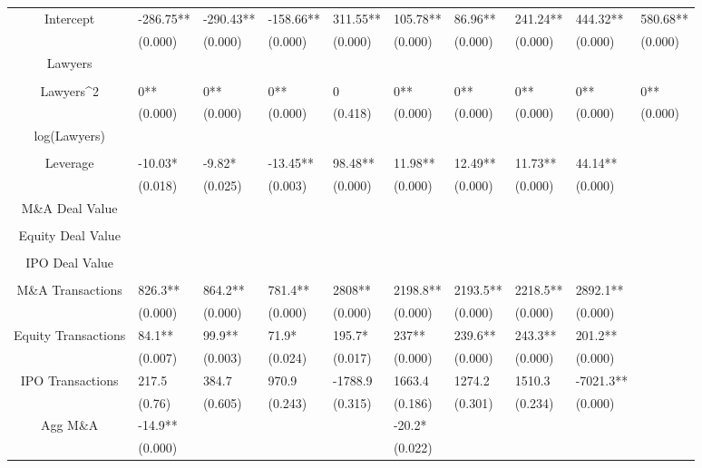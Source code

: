 \documentclass{article}
\begin{document}
\begin{table}[H]
\begin{tabular}{|clllllllll|}
Intercept & -286.75** & -290.43** & -158.66** & 311.55** & 105.78** & 86.96** & 241.24** & 444.32** & 580.68** \\ 
   & (0.000) & (0.000) & (0.000) & (0.000) & (0.000) & (0.000) & (0.000) & (0.000) & (0.000) \\ 
  Lawyers &  &  &  &  &  &  &  &  &  \\ 
   &  &  &  &  &  &  &  &  &  \\ 
  Lawyers^2 & 0** & 0** & 0** & 0 & 0** & 0** & 0** & 0** & 0** \\ 
   & (0.000) & (0.000) & (0.000) & (0.418) & (0.000) & (0.000) & (0.000) & (0.000) & (0.000) \\ 
  log(Lawyers) &  &  &  &  &  &  &  &  &  \\ 
   &  &  &  &  &  &  &  &  &  \\ 
  Leverage & -10.03* & -9.82* & -13.45** & 98.48** & 11.98** & 12.49** & 11.73** & 44.14** &  \\ 
   & (0.018) & (0.025) & (0.003) & (0.000) & (0.000) & (0.000) & (0.000) & (0.000) &  \\ 
  M\&A Deal Value &  &  &  &  &  &  &  &  &  \\ 
   &  &  &  &  &  &  &  &  &  \\ 
  Equity Deal Value &  &  &  &  &  &  &  &  &  \\ 
   &  &  &  &  &  &  &  &  &  \\ 
  IPO Deal Value &  &  &  &  &  &  &  &  &  \\ 
   &  &  &  &  &  &  &  &  &  \\ 
  M\&A Transactions & 826.3** & 864.2** & 781.4** & 2808** & 2198.8** & 2193.5** & 2218.5** & 2892.1** &  \\ 
   & (0.000) & (0.000) & (0.000) & (0.000) & (0.000) & (0.000) & (0.000) & (0.000) &  \\ 
  Equity Transactions & 84.1** & 99.9** & 71.9* & 195.7* & 237** & 239.6** & 243.3** & 201.2** &  \\ 
   & (0.007) & (0.003) & (0.024) & (0.017) & (0.000) & (0.000) & (0.000) & (0.000) &  \\ 
  IPO Transactions & 217.5 & 384.7 & 970.9 & -1788.9 & 1663.4 & 1274.2 & 1510.3 & -7021.3** &  \\ 
   & (0.76) & (0.605) & (0.243) & (0.315) & (0.186) & (0.301) & (0.234) & (0.000) &  \\ 
  Agg M\&A & -14.9** &  &  &  & -20.2* &  &  &  &  \\ 
   & (0.000) &  &  &  & (0.022) &  &  &  &  \\ 

\end{tabular}
\end{table}
\end{document}
